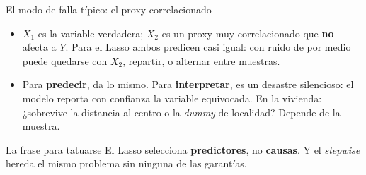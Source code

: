 \documentclass{beamer}
\newcommand{\1}{\mathbb{I}}
\begin{document}
\begin{frame}{El modo de falla típico: el proxy correlacionado}
\small
\begin{center}
\end{center}
\begin{itemize}\itemsep3pt
  \item $X_1$ es la variable verdadera; $X_2$ es un proxy muy correlacionado que \textbf{no} afecta a $Y$. Para el Lasso ambos predicen casi igual: con ruido de por medio puede quedarse con $X_2$, repartir, o alternar entre muestras. \pause
  \item Para \textbf{predecir}, da lo mismo. Para \textbf{interpretar}, es un desastre silencioso: el modelo reporta con confianza la variable equivocada. En la vivienda: ¿sobrevive la distancia al centro o la \emph{dummy} de localidad? Depende de la muestra.
\end{itemize}
\pause
\begin{block}{La frase para tatuarse}
El Lasso selecciona \textbf{predictores}, no \textbf{causas}. Y el \emph{stepwise} hereda el mismo problema sin ninguna de las garantías.
\end{block}
\end{frame}
\end{document}
